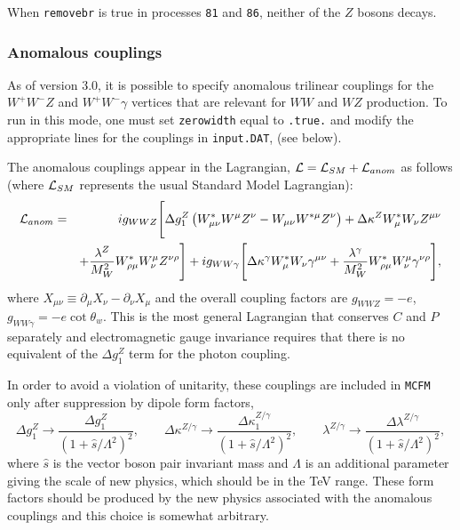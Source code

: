 \documentclass[12pt]{article}
\begin{document}
When {\tt removebr} is true in processes {\tt 81} and {\tt 86},
neither of the $Z$ bosons decays.

\subsubsection{Anomalous couplings}

As of version 3.0, it is possible to specify anomalous trilinear
couplings for the $W^+W^-Z$ and $W^+W^-\gamma$ vertices that are
relevant for $WW$ and $WZ$ production. To run in this mode, one
must set {\tt zerowidth} equal to {\tt .true.}
and modify the appropriate lines for the couplings in {\tt input.DAT},
(see below).

The anomalous couplings appear in the Lagrangian,
${\cal L} = {\cal L}_{SM} + {\cal L}_{anom}$ as follows
(where ${\cal L}_{SM}$ represents the usual Standard Model Lagrangian):
\begin{eqnarray}
{\cal L}_{anom} & = & i g_{WWZ} \Biggl[
 \Delta g_1^Z \left( W^*_{\mu\nu}W^\mu Z^\nu - W_{\mu\nu}W^{*\mu} Z^\nu \right)
+\Delta\kappa^Z W^*_\mu W_\nu Z^{\mu\nu} \nonumber \\
 & &+
 \frac{\lambda^Z}{M_W^2} W^*_{\rho\mu} W^\mu_\nu Z^{\nu\rho} \Biggr]
+i g_{WW\gamma} \Biggl[ 
 \Delta\kappa^\gamma W^*_\mu W_\nu \gamma^{\mu\nu}
+\frac{\lambda^\gamma}{M_W^2} W^*_{\rho\mu} W^\mu_\nu\gamma^{\nu\rho}
 \Biggr], \nonumber
\end{eqnarray}
where $X_{\mu\nu} \equiv \partial_\mu X_{\nu} - \partial_\nu X_{\mu}$
and the overall coupling factors are $g_{WWZ}=-e$,
$g_{WW\gamma}=-e\cot\theta_w$.
This is the most general Lagrangian that conserves $C$ and $P$
separately and electromagnetic gauge invariance requires that there
is no equivalent of the $\Delta g_1^Z$ term for the photon coupling.

In order to avoid a violation of unitarity, these couplings are included
in {\tt MCFM} only after suppression by dipole form factors,
\begin{displaymath}
\Delta g_1^Z \rightarrow \frac{\Delta g_1^Z}{(1+\hat{s}/\Lambda^2)^2}, \qquad
\Delta \kappa^{Z/\gamma} \rightarrow
 \frac{\Delta \kappa_1^{Z/\gamma}}{(1+\hat{s}/\Lambda^2)^2}, \qquad
\lambda^{Z/\gamma} \rightarrow
 \frac{\Delta \lambda^{Z/\gamma}}{(1+\hat{s}/\Lambda^2)^2},
\end{displaymath}
where $\hat{s}$ is the vector boson pair invariant mass and $\Lambda$
is an additional parameter giving the scale of new physics, which should
be in the TeV range.
These form factors should be produced by the new physics associated with the
anomalous couplings and this choice is somewhat arbitrary.
\end{document}
